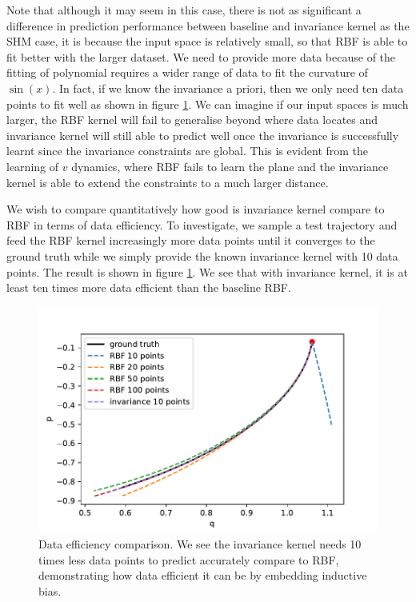 \documentclass{statsmsc}
\begin{document}
Note that although it may seem in this case, there is not as significant a difference in prediction performance between baseline and invariance kernel as the SHM case, it is because the input space is relatively small, so that RBF is able to fit better with the larger dataset.
We need to provide more data because of the fitting of polynomial requires a wider range of data to fit the curvature of $\sin(x)$. 
In fact, if we know the invariance a priori, then we only need ten data points to fit well as shown in figure \ref{fig:data_efficiency}.
We can imagine if our input spaces is much larger, the RBF kernel will fail to generalise beyond where data locates and invariance kernel will still able to predict well once the invariance is successfully learnt since the invariance constraints are global.
This is evident from the learning of $v$ dynamics, where RBF fails to learn the plane and the invariance kernel is able to extend the constraints to a much larger distance.

We wish to compare quantitatively how good is invariance kernel compare to RBF in terms of data efficiency. 
To investigate, we sample a test trajectory and feed the RBF kernel increasingly more data points until it converges to the ground truth while we simply provide the known invariance kernel with 10 data points.
The result is shown in figure \ref{fig:data_efficiency}. 
We see that with invariance kernel, it is at least ten times more data efficient than the baseline RBF.

\begin{figure}[H] 
  \includegraphics[width=0.8\linewidth]{../codes/figures/data_efficiency.pdf}
  \centering
  \caption{Data efficiency comparison. We see the invariance kernel needs 10 times less data points to predict accurately compare to RBF, demonstrating how data efficient it can be by embedding inductive bias.}
  \label{fig:data_efficiency}
\end{figure}
\end{document}
